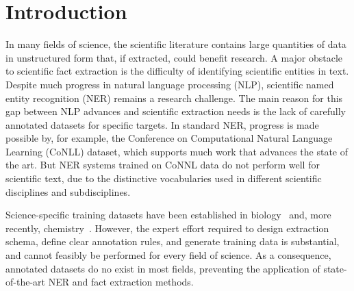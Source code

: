 \section{Introduction}
\label{sect:apner_introduction}

In many fields of science, the scientific literature contains large quantities of data in unstructured form that,
if extracted, could benefit research.
A major obstacle to scientific fact extraction is the difficulty of identifying scientific entities in text.
Despite much progress in natural language processing (NLP), 
scientific named entity recognition (NER) remains a research challenge.
The main reason for this gap between NLP advances and scientific extraction needs is the lack of carefully annotated datasets for specific targets.
In standard NER, 
progress is made possible by, for example, the 
Conference on Computational Natural Language Learning (CoNLL) dataset,
which supports much work that advances the state of the art.
But NER systems trained on CoNNL data do not perform well for scientific text, due to 
the distinctive vocabularies used in different scientific disciplines and subdisciplines.

Science-specific training datasets have been established in
biology~\cite{song2004posbiotm} and, more recently, chemistry~\cite{krallinger2015chemdner}.
However, the expert effort required to 
design 
extraction schema, 
define clear annotation rules, and generate training data %
is substantial, and cannot feasibly be performed for 
every field of science.
As a consequence, annotated datasets do no exist in most fields,
preventing the application of state-of-the-art NER and fact extraction methods.

